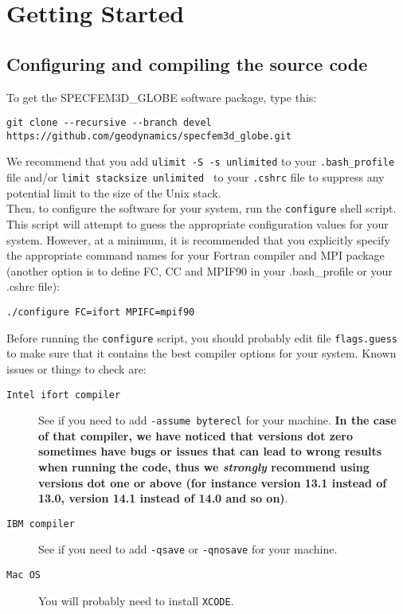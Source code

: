 \chapter{Getting Started}\label{cha:Getting-Started}

\section{Configuring and compiling the source code}

To get the SPECFEM3D\_GLOBE software package, type this:
\begin{verbatim}
git clone --recursive --branch devel https://github.com/geodynamics/specfem3d_globe.git
\end{verbatim}

We recommend that you add {\texttt{ulimit -S -s unlimited}} to your {\texttt{.bash\_profile}} file and/or {\texttt{limit stacksize unlimited }} to your {\texttt{.cshrc}} file to suppress any potential limit to the size of the Unix stack.\\

Then, to configure the software for your system, run the \texttt{configure}
shell script. This script will attempt to guess the appropriate configuration
values for your system. However, at a minimum, it is recommended that
you explicitly specify the appropriate command names for your Fortran
compiler and MPI package (another option is to define FC, CC and MPIF90 in your .bash\_profile
or your .cshrc file):
\begin{verbatim}
./configure FC=ifort MPIFC=mpif90
\end{verbatim}

Before running the \texttt{configure} script, you should probably edit file \texttt{flags.guess} to make sure that it contains the best compiler options for your system. Known issues or things to check are:

\begin{description}
\item [{\texttt{Intel ifort compiler}}] See if you need to add \texttt{-assume byterecl} for your machine. \textbf{In the case of that compiler, we have noticed that versions dot zero sometimes have bugs or issues that can lead to wrong results when running the code, thus we \emph{strongly} recommend using versions dot one or above (for instance version 13.1 instead of 13.0, version 14.1 instead of 14.0 and so on)}.
\item [{\texttt{IBM compiler}}] See if you need to add \texttt{-qsave} or \texttt{-qnosave} for your machine.
\item [{\texttt{Mac OS}}] You will probably need to install \texttt{XCODE}.
\end{description}

